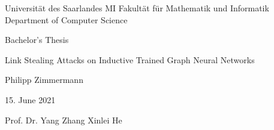 \documentclass{Thesis}
\begin{document}
	
	\thispagestyle{empty}
	
	\university 
		{Universität des Saarlandes}
		{MI Fakultät für Mathematik und Informatik}
		{Department of Computer Science}
	
	\thesis
		{Bachelor's Thesis}
		
	\topic 
		{Link Stealing Attacks on Inductive Trained Graph Neural Networks}
		
	\authors
		{Philipp Zimmermann}
	
	\handin
		{15. June 2021}
	
	\reviewers
		{Prof. Dr. Yang Zhang}
		{Xinlei He}
	
	
	
	\blankpage
	
	
	
	\thispagestyle{empty}
	
	\newpage
	
	
	
	\thispagestyle{empty}
	
	\newpage
	
	
	\thispagestyle{empty}
	\tableofcontents
	
	
	
	
\end{document}
